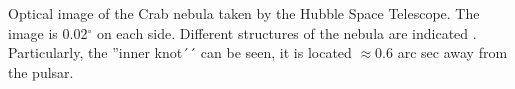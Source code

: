 \label{fig:knot}
Optical image of the Crab nebula taken by the Hubble Space Telescope. The image is 0.02$^\circ$ on each side. Different structures of the nebula are indicated \citep[e.g.][]{hester2002}. Particularly, the ''inner knot´´ can be seen, it is located $\approx 0.6$ arc sec away from the pulsar. 